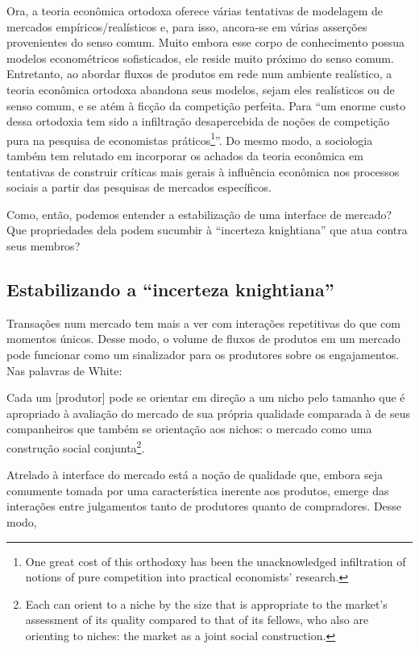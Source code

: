\documentclass[a4paper, 12pt, openright, oneside, german, french, english, brazil]{abntex2}
\begin{document}
	Ora, a teoria econômica ortodoxa oferece várias tentativas de modelagem de mercados empíricos/realísticos e, para isso, ancora-se em várias asserções provenientes do senso comum. Muito embora esse corpo de conhecimento possua modelos econométricos sofisticados, ele reside muito próximo do senso comum. Entretanto, ao abordar fluxos de produtos em rede num ambiente realístico, a teoria econômica ortodoxa abandona seus modelos, sejam eles realísticos ou de senso comum, e se atém à ficção da competição perfeita. Para  ``um enorme custo dessa ortodoxia tem sido a infiltração desapercebida de noções de competição pura na pesquisa de economistas práticos\footnote{One great cost of this orthodoxy has been the unacknowledged infiltration of notions of pure competition into practical economists' research.}''. Do mesmo modo, a sociologia também tem relutado em incorporar os achados da teoria econômica em tentativas de construir críticas mais gerais à influência econômica nos processos sociais a partir das pesquisas de mercados específicos.
	
	Como, então, podemos entender a estabilização de uma interface de mercado? Que propriedades dela podem sucumbir à ``incerteza knightiana'' que atua contra seus membros?
	
	\subsection{Estabilizando a ``incerteza knightiana''}
	
	Transações num mercado tem mais a ver com interações repetitivas do que com momentos únicos. Desse modo, o volume de fluxos de produtos em um mercado pode funcionar como um sinalizador para os produtores sobre os engajamentos. Nas palavras de White:
	
	\begin{citacao}
		Cada um [produtor] pode se orientar em direção a um nicho pelo tamanho que é apropriado à avaliação do mercado de sua própria qualidade comparada à de seus companheiros que também se orientação aos nichos: o mercado como uma construção social conjunta\footnote{Each can orient to a niche by the size that is appropriate to the market's assessment of its quality compared to that of its fellows, who also are orienting to niches: the market as a joint social construction.}. \cite[p. 10]{white2002markets}
	\end{citacao}
	
	Atrelado à interface do mercado está a noção de qualidade que, embora seja comumente tomada por uma característica inerente aos produtos, emerge das interações entre julgamentos tanto de produtores quanto de compradores. Desse modo,
	
\end{document}
